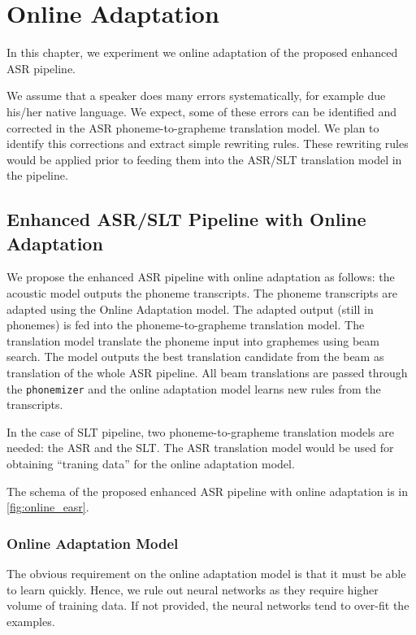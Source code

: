 \chapter{Online Adaptation}
\label{chap:adaptation}
In this chapter, we experiment we online adaptation of the proposed enhanced ASR pipeline.

We assume that a speaker does many errors systematically, for example due his/her native language. We expect, some of these errors can be identified and corrected in the ASR phoneme-to-grapheme translation model. We plan to identify this corrections and extract simple rewriting rules. These rewriting rules would be applied prior to feeding them into the ASR/SLT translation model in the pipeline.


\section{Enhanced ASR/SLT Pipeline with Online Adaptation}
\label{oeasr:model}
We propose the enhanced ASR pipeline with online adaptation as follows: the acoustic model outputs the phoneme transcripts. The phoneme transcripts are adapted using the Online Adaptation model. The adapted output (still in phonemes) is fed into the phoneme-to-grapheme translation model. The translation model translate the phoneme input into graphemes using beam search. The model outputs the best translation candidate from the beam as translation of the whole ASR pipeline. All beam translations are passed through the \texttt{phonemizer} and the online adaptation model learns new rules from the transcripts.

In the case of SLT pipeline, two phoneme-to-grapheme translation models are needed: the ASR and the SLT. The ASR translation model would be used for obtaining ``traning data'' for the online adaptation model.

The schema of the proposed enhanced ASR pipeline with online adaptation is in \cref{fig:online_easr}.

\subsection{Online Adaptation Model}
The obvious requirement on the online adaptation model is that it must be able to learn quickly. Hence, we rule out neural networks as they require higher volume of training data. If not provided, the neural networks tend to over-fit the examples. 

